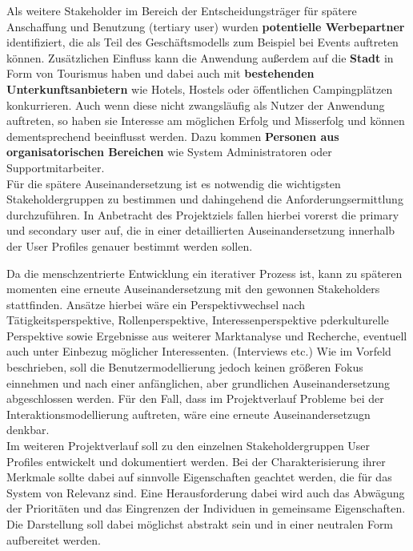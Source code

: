 Als weitere Stakeholder im Bereich der Entscheidungsträger für spätere Anschaffung und Benutzung (tertiary user) wurden \textbf{potentielle Werbepartner} identifiziert, die als Teil des Geschäftsmodells zum Beispiel bei Events auftreten können. Zusätzlichen Einfluss kann die Anwendung außerdem auf die \textbf{Stadt} in Form von Tourismus haben und dabei auch mit \textbf{bestehenden Unterkunftsanbietern} wie Hotels, Hostels oder öffentlichen Campingplätzen konkurrieren. Auch wenn diese nicht zwangsläufig als Nutzer der Anwendung auftreten, so haben sie Interesse am möglichen Erfolg und Misserfolg und können dementsprechend beeinflusst werden.
Dazu kommen \textbf{Personen aus organisatorischen Bereichen} wie System Administratoren oder Supportmitarbeiter.\\
 
Für die spätere Auseinandersetzung ist es notwendig die wichtigsten Stakeholdergruppen zu bestimmen und dahingehend die Anforderungsermittlung durchzuführen.
In Anbetracht des Projektziels fallen hierbei vorerst die primary und secondary user auf, die in einer detaillierten Auseinandersetzung innerhalb der User Profiles genauer bestimmt werden sollen.
 
Da die menschzentrierte Entwicklung ein iterativer Prozess ist, kann zu späteren momenten eine erneute Auseinandersetzung mit den gewonnen Stakeholders stattfinden.
Ansätze hierbei wäre ein Perspektivwechsel nach Tätigkeitsperspektive, Rollenperspektive, Interessenperspektive pderkulturelle Perspektive sowie Ergebnisse aus weiterer Marktanalyse und Recherche, eventuell auch unter Einbezug möglicher Interessenten. (Interviews etc.)
Wie im Vorfeld beschrieben, soll die Benutzermodellierung jedoch keinen größeren Fokus einnehmen und nach einer anfänglichen, aber grundlichen Auseinandersetzung abgeschlossen werden. Für den Fall, dass im Projektverlauf Probleme bei der Interaktionsmodellierung auftreten, wäre eine erneute Auseinandersetzugn denkbar.\\
 
 Im weiteren Projektverlauf soll zu den einzelnen Stakeholdergruppen User Profiles entwickelt und dokumentiert werden. Bei der Charakterisierung ihrer Merkmale sollte dabei auf sinnvolle Eigenschaften geachtet werden, die für das System von Relevanz sind. Eine Herausforderung dabei wird auch das Abwägung der Prioritäten und das Eingrenzen der Individuen in gemeinsame Eigenschaften. Die Darstellung soll dabei möglichst abstrakt sein und in einer neutralen Form aufbereitet werden.


 


